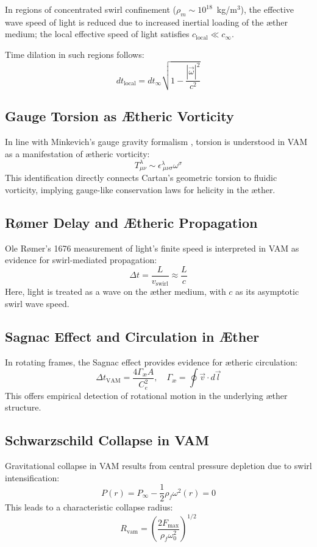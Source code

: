 \documentclass[preprint]{revtex4-2}
\begin{document}
            In regions of concentrated swirl confinement ($\rho_{\scriptscriptstyle\boldsymbol\!m} \sim 10^{18}$~kg/m$^3$), the effective wave speed of light is reduced due to increased inertial loading of the æther medium; the local effective speed of light satisfies $c_\text{local} \ll c_\infty$.

            Time dilation in such regions follows:
            \[
                dt_\text{local} = dt_\infty \sqrt{1 - \frac{|\vec{\omega}|^2}{c^2}}
            \]

            \subsection*{Gauge Torsion as Ætheric Vorticity}
            In line with Minkevich’s gauge gravity formalism \cite{minkevich2008gauge}, torsion is understood in VAM as a manifestation of ætheric vorticity:
            \[
                T^\lambda_{\mu\nu} \sim \epsilon^{\lambda}_{\ \mu\nu\sigma} \omega^\sigma
            \]
            This identification directly connects Cartan's geometric torsion to fluidic vorticity, implying gauge-like conservation laws for helicity in the æther.

            \subsection*{Rømer Delay and Ætheric Propagation}
            Ole Rømer’s 1676 measurement of light’s finite speed \cite{roemer1676light} is interpreted in VAM as evidence for swirl-mediated propagation:
            \[
                \Delta t = \frac{L}{v_\text{swirl}} \approx \frac{L}{c}
            \]
            Here, light is treated as a wave on the æther medium, with $c$ as its asymptotic swirl wave speed.

            \subsection*{Sagnac Effect and Circulation in Æther}
            In rotating frames, the Sagnac effect provides evidence for ætheric circulation:
            \[
                \Delta t_\text{VAM} = \frac{4 \Gamma_{\text{\ae}} A}{C_e^2}, \quad \Gamma_{\text{\ae}} = \oint \vec{v} \cdot d\vec{l}
            \]
            This offers empirical detection of rotational motion in the underlying æther structure.

            \subsection*{Schwarzschild Collapse in VAM}
            Gravitational collapse in VAM results from central pressure depletion due to swirl intensification:
            \[
                P(r) = P_\infty - \frac{1}{2} \rho_{\scriptscriptstyle\boldsymbol\!f} \omega^2(r) = 0
            \]
            This leads to a characteristic collapse radius:
            \[
                R_\text{vam} = \left( \frac{2 F_{\text{max}}}{\rho_{\scriptscriptstyle\boldsymbol\!f} \omega_0^2} \right)^{1/2}
            \]
\end{document}
